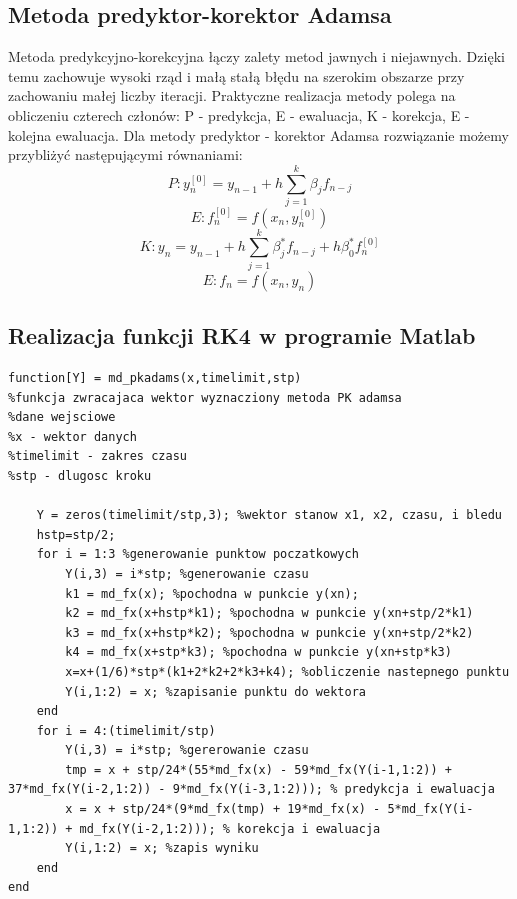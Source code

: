 \documentclass[a4paper, 11pt]{article}
\begin{document}
\subsection{Metoda predyktor-korektor Adamsa}
Metoda predykcyjno-korekcyjna łączy zalety metod jawnych i niejawnych. Dzięki temu zachowuje wysoki rząd i małą stałą błędu na szerokim obszarze przy zachowaniu małej liczby iteracji. Praktyczne realizacja metody polega na obliczeniu czterech członów: P - predykcja, E - ewaluacja, K - korekcja, E - kolejna ewaluacja. Dla metody predyktor - korektor Adamsa rozwiązanie możemy przybliżyć następującymi równaniami: 
$$P:  y_{n}^{[0]} = y_{n-1} + h \sum_{j=1}^{k} \beta_{j}f_{n-j}$$
$$E:  f_{n}^{[0]} = f(x_{n},y_{n}^{[0]})$$
$$K:  y_{n} = y_{n-1} + h \sum_{j=1}^{k} \beta_{j}^{*}f_{n-j}+h\beta_{0}^{*}f_{n}^{[0]}$$
$$E:  f_{n} = f(x_{n},y_{n})$$


\subsection{Realizacja funkcji RK4 w programie Matlab}
\begin{lstlisting}
function[Y] = md_pkadams(x,timelimit,stp)
%funkcja zwracajaca wektor wyznacziony metoda PK adamsa 
%dane wejsciowe
%x - wektor danych 
%timelimit - zakres czasu
%stp - dlugosc kroku
   
    Y = zeros(timelimit/stp,3); %wektor stanow x1, x2, czasu, i bledu
    hstp=stp/2;
    for i = 1:3 %generowanie punktow poczatkowych
        Y(i,3) = i*stp; %generowanie czasu
        k1 = md_fx(x); %pochodna w punkcie y(xn);
        k2 = md_fx(x+hstp*k1); %pochodna w punkcie y(xn+stp/2*k1) 
        k3 = md_fx(x+hstp*k2); %pochodna w punkcie y(xn+stp/2*k2)
        k4 = md_fx(x+stp*k3); %pochodna w punkcie y(xn+stp*k3)
        x=x+(1/6)*stp*(k1+2*k2+2*k3+k4); %obliczenie nastepnego punktu
        Y(i,1:2) = x; %zapisanie punktu do wektora
    end
    for i = 4:(timelimit/stp)
        Y(i,3) = i*stp; %gererowanie czasu
        tmp = x + stp/24*(55*md_fx(x) - 59*md_fx(Y(i-1,1:2)) + 37*md_fx(Y(i-2,1:2)) - 9*md_fx(Y(i-3,1:2))); % predykcja i ewaluacja
        x = x + stp/24*(9*md_fx(tmp) + 19*md_fx(x) - 5*md_fx(Y(i-1,1:2)) + md_fx(Y(i-2,1:2))); % korekcja i ewaluacja
        Y(i,1:2) = x; %zapis wyniku
    end
end

\end{lstlisting}
\end{document}
